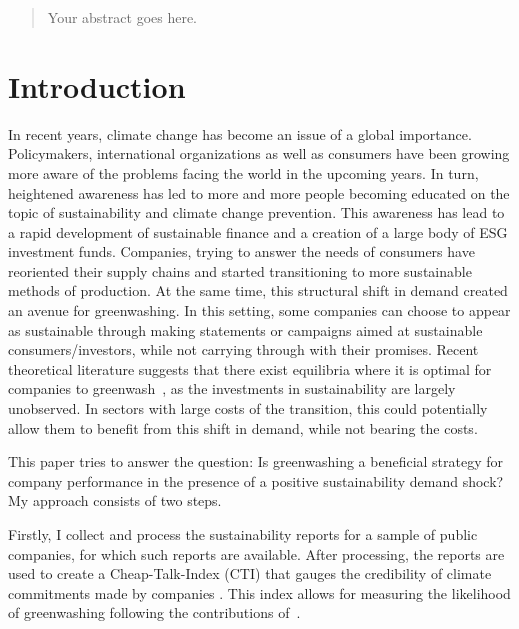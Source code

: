 \documentclass[12pt]{article}
\author{Your Name}
\date{Date of submission: \today}
\begin{document}

\pagebreak

\begin{abstract}
Your abstract goes here.


\end{abstract}
\pagebreak

\tableofcontents
\pagebreak
\listoffigures
\listoftables
\pagebreak

\section{Introduction}\label{sect:introduction}

In recent years, climate change has become an issue of a global importance. Policymakers, international 
organizations as well as consumers have been growing more aware of the problems facing the world in the upcoming years. In turn, heightened awareness has led to more and more people becoming educated on the topic of sustainability and climate change prevention. This awareness has lead to a rapid development of sustainable finance and a creation of a large body of ESG investment funds. Companies, trying to answer the needs of consumers have reoriented their supply chains and started transitioning to more sustainable methods of production. At the same time, this structural shift in demand created an avenue for greenwashing. In this setting, some companies can choose to appear as sustainable through making statements or campaigns aimed at sustainable consumers/investors, while not carrying through with their promises. Recent theoretical literature suggests that there exist equilibria where it is optimal for companies to greenwash~\parencite{wu_bad_2020, cartellierCanInvestorsCurb2023}, as the investments in sustainability are largely unobserved. In sectors with large costs of the transition, this could potentially allow them to benefit from this shift in demand, while not bearing the costs. 

This paper tries to answer the question: Is greenwashing a beneficial strategy for company performance in the presence of a positive sustainability demand shock? My approach consists of two steps.

Firstly, I collect and process the sustainability reports for a sample of public companies, for which such reports are available. After processing, the reports are used to create a Cheap-Talk-Index (CTI) that gauges the credibility of climate commitments made by companies \parencite{bingler_how_2024}. This index allows for measuring the likelihood of greenwashing following the contributions of~\cite{coen_are_2022}.
\end{document}

